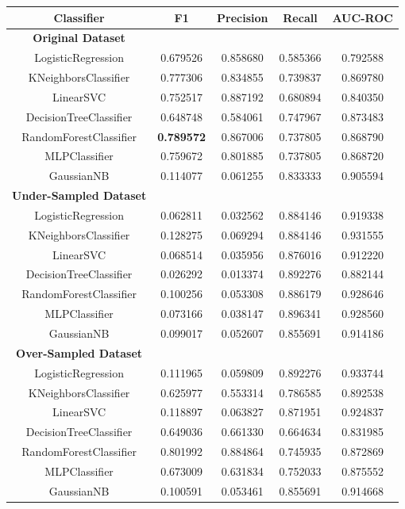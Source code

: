 \documentclass[12pt,a4paper,twoside]{report}
\begin{document}
\begin{table}[!htbp]  
  \centering
  \begin{tabular}{ccccc}
    \toprule
     Classifier & F1 & Precision & Recall & AUC-ROC \\ \midrule
     \textbf{Original Dataset} \\ \midrule
    LogisticRegression & 0.679526 &  0.858680 & 0.585366 & 0.792588 \\
    KNeighborsClassifier & 0.777306 &  0.834855 & 0.739837 & 0.869780\\
    LinearSVC  & 0.752517 &  0.887192  & 0.680894 & 0.840350 \\
    DecisionTreeClassifier & 0.648748 & 0.584061 & 0.747967 & 0.873483 \\
    RandomForestClassifier & \textbf{0.789572} &  0.867006  & 0.737805 & 0.868790\\
    MLPClassifier & 0.759672  & 0.801885 & 0.737805 & 0.868720 \\
    GaussianNB & 0.114077  & 0.061255 & 0.833333 & 0.905594 \\ \midrule
    \textbf{Under-Sampled Dataset} \\  \midrule
    
    LogisticRegression & 0.062811 &  0.032562 & 0.884146 & 0.919338 \\
    KNeighborsClassifier & 0.128275  & 0.069294 & 0.884146 & 0.931555\\
    LinearSVC  & 0.068514 &  0.035956 &  0.876016  & 0.912220 \\
    DecisionTreeClassifier & 0.026292 &  0.013374 & 0.892276 & 0.882144 \\
    RandomForestClassifier & 0.100256 &  0.053308 & 0.886179  & 0.928646\\
    MLPClassifier & 0.073166  & 0.038147 &  0.896341 & 0.928560 \\
    GaussianNB & 0.099017 &  0.052607 & 0.855691 & 0.914186 \\ \midrule
    
    \textbf{Over-Sampled Dataset} \\  \midrule
    
    LogisticRegression & 0.111965 &  0.059809 & 0.892276 & 0.933744 \\
    KNeighborsClassifier &0.625977  & 0.553314 & 0.786585 & 0.892538\\
    LinearSVC  & 0.118897  & 0.063827 & 0.871951  & 0.924837 \\
    DecisionTreeClassifier & 0.649036  & 0.661330 & 0.664634 & 0.831985 \\
    RandomForestClassifier &  0.801992 &  0.884864 & 0.745935  & 0.872869\\
    MLPClassifier & 0.673009  & 0.631834 & 0.752033 & 0.875552 \\
    GaussianNB & 0.100591  & 0.053461 & 0.855691 & 0.914668 \\ \midrule
    

\end{tabular}
\end{table}
\end{document}
